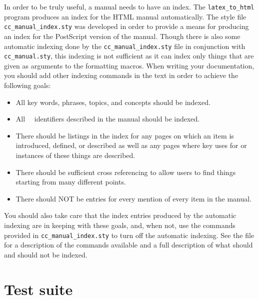 In order to be truly useful, a manual needs to have an index.  The 
{\tt latex\_to\_html} program produces an index for the HTML manual
automatically.  %
The style file {\tt cc\_manual\_index.sty}%
 was developed in order to provide
a means for producing an index for the PostScript version of the manual.  
Though there is also some automatic indexing done by the
{\tt cc\_manual\_index.sty} file in conjunction with {\tt cc\_manual.sty},
this indexing is not sufficient as it can index only things that are
given as arguments to the formatting macros.  When writing your
documentation, you should add other indexing commands in the text in
order to achieve the following goals:
\begin{itemize}
   \item All key words, phrases, topics, and concepts should be indexed.
   \item All \cgal\ \CC\ identifiers described in the manual should be indexed.
   \item There should be listings in the index for any pages on which an
         item is introduced, defined, or described as well as any pages
         where key uses for or instances of these things are described.
   \item There should be sufficient cross referencing to allow users
         to find things starting from many different points.
   \item There should NOT be entries for every mention of every item in the
         manual.
\end{itemize}

You should also take care that the index entries produced by the automatic
indexing are in keeping with these goals, and, when not, use the commands
provided in {\tt cc\_manual\_index.sty} to turn off the automatic indexing.
See the file 
for a description of the commands available and a full description of what
should and should not be indexed.



\section{Test suite}
\label{sec:doc_test_suite}


